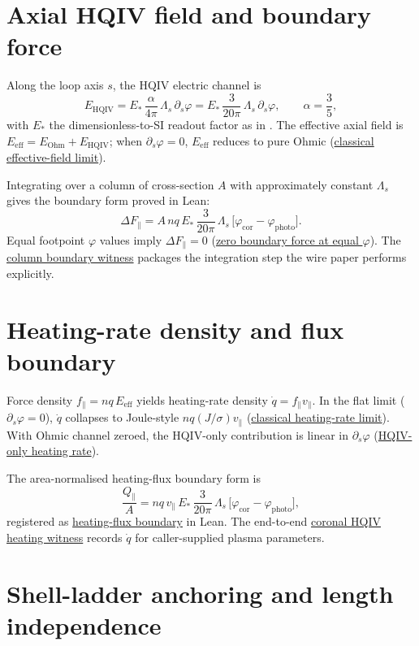 \documentclass[11pt]{amsart}
\begin{document}
\section{Axial HQIV field and boundary force}
\label{sec:field}

Along the loop axis $s$, the HQIV electric channel is
\[
E_{\mathrm{HQIV}}
  = E_\ast\,\frac{\alpha}{4\pi}\,\Lambda_s\,\partial_s\varphi
  = E_\ast\,\frac{3}{20\pi}\,\Lambda_s\,\partial_s\varphi,
\qquad \alpha=\frac35,
\]
with $E_\ast$ the dimensionless-to-SI readout factor as in
\cite{ettinger2026longitudinal}. The effective axial field is
$E_{\mathrm{eff}}=E_{\mathrm{Ohm}}+E_{\mathrm{HQIV}}$; when $\partial_s\varphi=0$,
$E_{\mathrm{eff}}$ reduces to pure Ohmic
(\hyperref[lean:classical-effective]{classical effective-field limit}).

Integrating over a column of cross-section $A$ with approximately constant
$\Lambda_s$ gives the boundary form proved in Lean:
\[
\Delta F_\parallel
  = A\,nq\,E_\ast\,\frac{3}{20\pi}\,\Lambda_s\,
    \bigl[\varphi_{\mathrm{cor}}-\varphi_{\mathrm{photo}}\bigr].
\]
Equal footpoint $\varphi$ values imply $\Delta F_\parallel=0$
(\hyperref[lean:boundary-zero]{zero boundary force at equal $\varphi$}).
The \hyperref[lean:column-witness]{column boundary witness} packages the
integration step the wire paper performs explicitly.

\section{Heating-rate density and flux boundary}
\label{sec:heating}

Force density $f_\parallel=nq\,E_{\mathrm{eff}}$ yields heating-rate density
$\dot q=f_\parallel v_\parallel$. In the flat limit ($\partial_s\varphi=0$),
$\dot q$ collapses to Joule-style $nq(J/\sigma)v_\parallel$
(\hyperref[lean:heating-flat]{classical heating-rate limit}). With Ohmic channel
zeroed, the HQIV-only contribution is linear in $\partial_s\varphi$
(\hyperref[lean:heating-hqiv-only]{HQIV-only heating rate}).

The area-normalised heating-flux boundary form is
\[
\frac{Q_\parallel}{A}
  = nq\,v_\parallel\,E_\ast\,\frac{3}{20\pi}\,\Lambda_s\,
    \bigl[\varphi_{\mathrm{cor}}-\varphi_{\mathrm{photo}}\bigr],
\]
registered as \hyperref[lean:heating-flux]{heating-flux boundary} in Lean.
The end-to-end \hyperref[lean:heating-witness]{coronal HQIV heating witness}
records $\dot q$ for caller-supplied plasma parameters.

\section{Shell-ladder anchoring and length independence}
\label{sec:shell}
\end{document}
